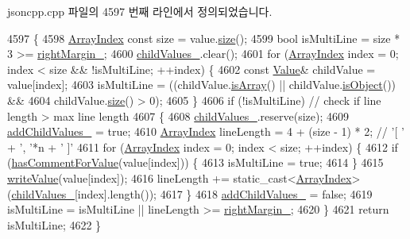 jsoncpp.\+cpp 파일의 4597 번째 라인에서 정의되었습니다.


\begin{DoxyCode}
4597                                                     \{
4598   \hyperlink{namespace_json_a8048e741f2177c3b5d9ede4a5b8c53c2}{ArrayIndex} \textcolor{keyword}{const} size = value.\hyperlink{class_json_1_1_value_a0ec2808e1d7efa4e9fad938d6667be44}{size}();
4599   \textcolor{keywordtype}{bool} isMultiLine = size * 3 >= \hyperlink{class_json_1_1_styled_writer_ae648d2e1fc0f7d45c748c96805106cb0}{rightMargin\_};
4600   \hyperlink{class_json_1_1_styled_writer_a1f905495f0705365af117ec541e29fdf}{childValues\_}.clear();
4601   \textcolor{keywordflow}{for} (\hyperlink{namespace_json_a8048e741f2177c3b5d9ede4a5b8c53c2}{ArrayIndex} index = 0; index < size && !isMultiLine; ++index) \{
4602     \textcolor{keyword}{const} \hyperlink{class_json_1_1_value}{Value}& childValue = value[index];
4603     isMultiLine = ((childValue.\hyperlink{class_json_1_1_value_a1627eb9d6568d6d0252fa8bb711c0a59}{isArray}() || childValue.\hyperlink{class_json_1_1_value_a8cf96c0f2a552051fcfc78ffee60e037}{isObject}()) &&
4604                         childValue.\hyperlink{class_json_1_1_value_a0ec2808e1d7efa4e9fad938d6667be44}{size}() > 0);
4605   \}
4606   \textcolor{keywordflow}{if} (!isMultiLine) \textcolor{comment}{// check if line length > max line length}
4607   \{
4608     \hyperlink{class_json_1_1_styled_writer_a1f905495f0705365af117ec541e29fdf}{childValues\_}.reserve(size);
4609     \hyperlink{class_json_1_1_styled_writer_acaabfa48b50a8bb7fa9ce98e2ae971d9}{addChildValues\_} = \textcolor{keyword}{true};
4610     \hyperlink{namespace_json_a8048e741f2177c3b5d9ede4a5b8c53c2}{ArrayIndex} lineLength = 4 + (size - 1) * 2; \textcolor{comment}{// '[ ' + ', '*n + ' ]'}
4611     \textcolor{keywordflow}{for} (\hyperlink{namespace_json_a8048e741f2177c3b5d9ede4a5b8c53c2}{ArrayIndex} index = 0; index < size; ++index) \{
4612       \textcolor{keywordflow}{if} (\hyperlink{class_json_1_1_styled_writer_a37a806d010f708cb68556f2666f79bdf}{hasCommentForValue}(value[index])) \{
4613         isMultiLine = \textcolor{keyword}{true};
4614       \}
4615       \hyperlink{class_json_1_1_styled_writer_ac40143cf43f7c4a94d3d0b41e5245069}{writeValue}(value[index]);
4616       lineLength += \textcolor{keyword}{static\_cast<}\hyperlink{namespace_json_a8048e741f2177c3b5d9ede4a5b8c53c2}{ArrayIndex}\textcolor{keyword}{>}(\hyperlink{class_json_1_1_styled_writer_a1f905495f0705365af117ec541e29fdf}{childValues\_}[index].length());
4617     \}
4618     \hyperlink{class_json_1_1_styled_writer_acaabfa48b50a8bb7fa9ce98e2ae971d9}{addChildValues\_} = \textcolor{keyword}{false};
4619     isMultiLine = isMultiLine || lineLength >= \hyperlink{class_json_1_1_styled_writer_ae648d2e1fc0f7d45c748c96805106cb0}{rightMargin\_};
4620   \}
4621   \textcolor{keywordflow}{return} isMultiLine;
4622 \}
\end{DoxyCode}
